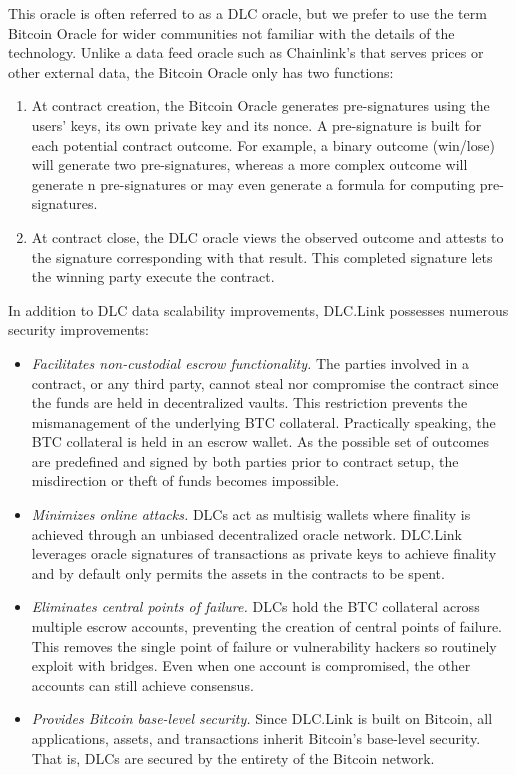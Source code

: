 \documentclass[twoside, a4paper, 11pt]{article}
\begin{document}
  This oracle is often referred to as a DLC oracle, but we prefer to use the term Bitcoin Oracle for wider communities not familiar with the details of the technology. Unlike a data feed oracle such as Chainlink’s that serves prices or other external data, the Bitcoin Oracle only has two functions:

  \begin{enumerate}
    \item At contract creation, the Bitcoin Oracle generates pre-signatures using the users’ keys, its own private key and its nonce. A pre-signature is built for each potential contract outcome. For example, a binary outcome (win/lose) will generate two pre-signatures, whereas a more complex outcome will generate n pre-signatures or may even generate a formula for computing pre-signatures.
    \item At contract close, the DLC oracle views the observed outcome and attests to the signature corresponding with that result. This completed signature lets the winning party execute the contract.
  \end{enumerate}

  In addition to DLC data scalability improvements, DLC.Link possesses numerous security improvements:
  \begin{itemize}
    \item \emph{Facilitates non-custodial escrow functionality.} The parties involved in a contract, or any third party, cannot steal nor compromise the contract since the funds are held in decentralized vaults. This restriction prevents the mismanagement of the underlying BTC collateral. Practically speaking, the BTC collateral is held in an escrow wallet. As the possible set of outcomes are predefined and signed by both parties prior to contract setup, the misdirection or theft of funds becomes impossible.
    \item \emph{Minimizes online attacks.} DLCs act as multisig wallets where finality is achieved through an unbiased decentralized oracle network. DLC.Link leverages oracle signatures of transactions as private keys to achieve finality and by default only permits the assets in the contracts to be spent.
    \item \emph{Eliminates central points of failure.} DLCs hold the BTC collateral across multiple escrow accounts, preventing the creation of central points of failure. This removes the single point of failure or vulnerability hackers so routinely exploit with bridges. Even when one account is compromised, the other accounts can still achieve consensus.
    \item  \emph{Provides Bitcoin base-level security.} Since DLC.Link is built on Bitcoin, all applications, assets, and transactions inherit Bitcoin’s base-level security. That is, DLCs are secured by the entirety of the Bitcoin network.
  \end{itemize}
\end{document}
